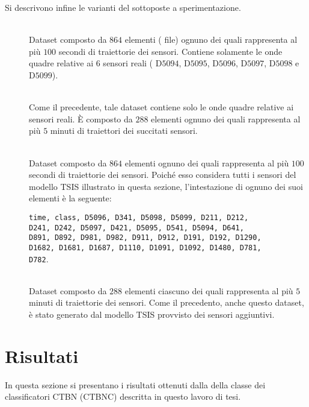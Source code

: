 Si descrivono infine le varianti del  sottoposte a sperimentazione.
\begin{description}
	\item[] \hfill \\
	Dataset composto da $864$ elementi (\ie{} file) ognuno dei quali rappresenta al più $100$ secondi di traiettorie dei sensori. Contiene solamente le onde quadre relative ai $6$ sensori reali (\ie{} D$5094$, D$5095$, D$5096$, D$5097$, D$5098$ e D$5099$).
	\item[] \hfill \\
	Come il precedente, tale dataset contiene solo le onde quadre relative ai sensori reali. \`E composto da $288$ elementi ognuno dei quali rappresenta al più $5$ minuti di traiettori dei succitati sensori.
	\item[] \hfill \\
	Dataset composto da $864$ elementi ognuno dei quali rappresenta al più $100$ secondi di traiettorie dei sensori. Poiché esso considera tutti i sensori del modello \acs{TSIS} illustrato in questa sezione, l'intestazione di ognuno dei suoi elementi è la seguente:\par
	\lstinline[]|time, class, D5096, D341, D5098, D5099, D211, D212, |\\\lstinline[]|D241, D242, D5097, D421, D5095, D541, D5094, D641, |\\\lstinline[]|D891, D892, D981, D982, D911, D912, D191, D192, D1290, |\\\lstinline[]|D1682, D1681, D1687, D1110, D1091, D1092, D1480, D781, |\\\lstinline[]|D782|.
	\item[] \hfill \\
	Dataset composto da $288$ elementi ciascuno dei quali rappresenta al più $5$ minuti di traiettorie dei sensori. Come il precedento, anche questo dataset, è stato generato dal modello \acs{TSIS} provvisto dei sensori aggiuntivi.
\end{description}

\cleardoublepage
\section{Risultati}
In questa sezione si presentano i risultati ottenuti dalla  della classe dei classificatori \acs{CTBN} (\acs{CTBNC}) descritta in questo lavoro di tesi.

